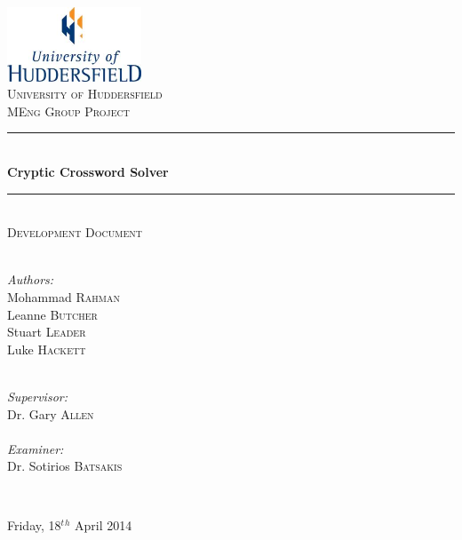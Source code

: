 \newcommand{\HRule}{\rule{\linewidth}{0.5mm}}

\begin{titlepage}
  \begin{center}

  \includegraphics[width=0.3\textwidth]{../UoHLogo.jpg} \\[2.5cm]

  \textsc{\LARGE University of Huddersfield} \\[1.5cm]

  \textsc{\Large MEng Group Project} \\[0.75cm]

  \HRule \\[0.4cm]
    { \huge \bfseries Cryptic Crossword Solver }
  \\[0.1cm]

  \HRule \\[0.75cm]

  \textsc{\Large Development Document} \\[2cm]

  \begin{minipage}{0.4\textwidth}
    \begin{flushleft} \large ~\\
      \emph{Authors:}\\
      Mohammad \textsc{Rahman} \\
      Leanne \textsc{Butcher} \\
      Stuart \textsc{Leader} \\
      Luke \textsc{Hackett} 
    \end{flushleft}
  \end{minipage}
  \begin{minipage}{0.4\textwidth}
    \begin{flushright} \large ~\\
      \emph{Supervisor:} \\ 
      Dr. Gary \textsc{Allen}
      ~\\ ~\\
      \emph{Examiner:} \\
      Dr. Sotirios \textsc{Batsakis} 
    \end{flushright}
  \end{minipage}

  ~\\[0.01cm]


  \vfill

  {\large Friday, 18$^t$$^h$ April 2014}

  \end{center}
\end{titlepage}
